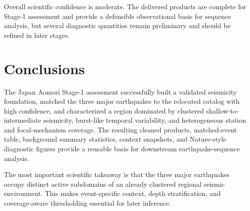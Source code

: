 \documentclass[11pt]{article}
\begin{document}
Overall scientific confidence is moderate. The delivered products are complete for Stage-1 assessment and provide a defensible observational basis for sequence analysis, but several diagnostic quantities remain preliminary and should be refined in later stages.

\section{Conclusions}
The Japan Aomori Stage-1 assessment successfully built a validated seismicity foundation, matched the three major earthquakes to the relocated catalog with high confidence, and characterized a region dominated by clustered shallow-to-intermediate seismicity, burst-like temporal variability, and heterogeneous station and focal-mechanism coverage. The resulting cleaned products, matched-event table, background summary statistics, context snapshots, and Nature-style diagnostic figures provide a reusable basis for downstream earthquake-sequence analysis.

The most important scientific takeaway is that the three major earthquakes occupy distinct active subdomains of an already clustered regional seismic environment. This makes event-specific context, depth stratification, and coverage-aware thresholding essential for later inference.
\end{document}
